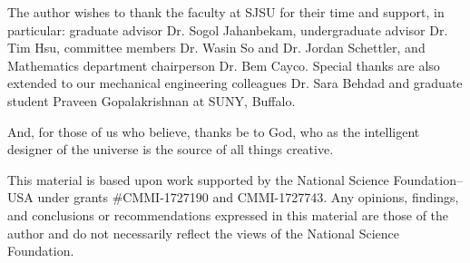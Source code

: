 The author wishes to thank the faculty at SJSU for their time and support, in particular: graduate advisor
Dr. Sogol Jahanbekam, undergraduate advisor Dr. Tim Hsu, committee members Dr. Wasin So and Dr. Jordan Schettler,
and Mathematics department chairperson Dr. Bem Cayco.  Special thanks are also extended to our mechanical
engineering colleagues Dr. Sara Behdad and graduate student Praveen Gopalakrishnan at SUNY, Buffalo.

And, for those of us who believe, thanks be to God, who as the intelligent designer of the universe is the source
of all things creative.

This material is based upon work supported by the National Science Foundation–USA under grants \#CMMI-1727190 and
CMMI-1727743. Any opinions, findings, and conclusions or recommendations expressed in this material are those of
the author and do not necessarily reflect the views of the National Science Foundation.
